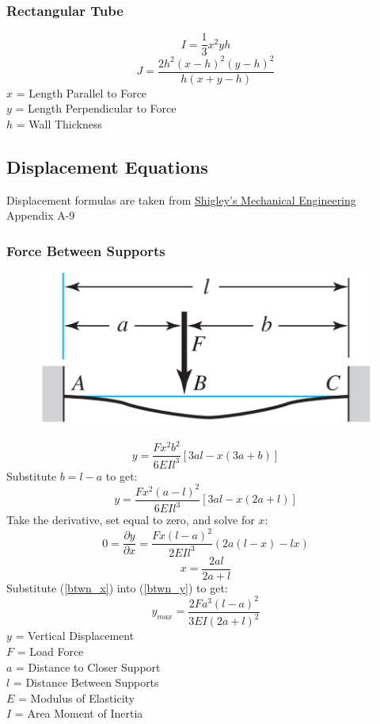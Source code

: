 \documentclass[11pt,a4paper,titlepage]{article}
\begin{document}
	\subsubsection{Rectangular Tube}
	\begin{equation}
		I = \frac{1}{3} x^2 y h
	\end{equation}
	\begin{equation}
		J = \frac{2 h^2 (x-h)^2 (y-h)^2}{h (x + y - h)}
	\end{equation}
	$x$ = Length Parallel to Force \\
	$y$ = Length Perpendicular to Force \\
	$h$ = Wall Thickness
	
	\subsection{Displacement Equations}
	Displacement formulas are taken from \href{https://fac.ksu.edu.sa/sites/default/files/mechanical-disgin-shigley.pdf}{Shigley's Mechanical Engineering} Appendix A-9
	\subsubsection{Force Between Supports}
	\begin{figure}[H]
		\centering
		\includegraphics[width=0.7\linewidth]{"Force_Btwn_Supports"}
	\end{figure}
	
	\begin{equation}
		y = \frac{F x^2 b^2}{6 EI l^3} [3al-x(3a+b)]
	\end{equation}
	Substitute $b=l-a$ to get:
	\begin{equation} \label{btwn_y}
		y = \frac{F x^2 (a-l)^2}{6 EI l^3} [3al-x(2a+l)]
	\end{equation}
	\newpage
	Take the derivative, set equal to zero, and solve for $x$:
	\begin{equation}
		0 = \frac{\partial y}{\partial x} = \frac{F x (l-a)^2}{2 EI l^3} (2a (l-x) - lx)
	\end{equation}
	\begin{equation} \label{btwn_x}
		x = \frac{2al}{2a + l}
	\end{equation}
	Substitute (\ref{btwn_x}) into (\ref{btwn_y}) to get:
	\begin{equation}
		y_{max} = \frac{2 F a^3 (l-a)^2}{3 EI (2a+l)^2}
	\end{equation}
	$y$ = Vertical Displacement \\
	$F$ = Load Force \\
	$a$ = Distance to Closer Support \\
	$l$ = Distance Between Supports \\
	$E$ = Modulus of Elasticity \\
	$I$ = Area Moment of Inertia
	
\end{document}
